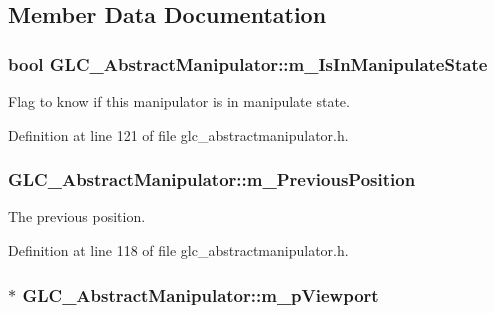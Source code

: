 \subsection{Member Data Documentation}
\hypertarget{class_g_l_c___abstract_manipulator_ace23989bdf7072dcecd4f005e5b95485}{
\subsubsection[{m\-\_\-\-Is\-In\-Manipulate\-State}]{\setlength{\rightskip}{0pt plus 5cm}bool G\-L\-C\-\_\-\-Abstract\-Manipulator\-::m\-\_\-\-Is\-In\-Manipulate\-State\hspace{0.3cm}{\ttfamily [protected]}}}\label{class_g_l_c___abstract_manipulator_ace23989bdf7072dcecd4f005e5b95485}


Flag to know if this manipulator is in manipulate state. 



Definition at line 121 of file glc\-\_\-abstractmanipulator.\-h.

\hypertarget{class_g_l_c___abstract_manipulator_a686032db93afdc2bee8248bded9c74dc}{
\subsubsection[{m\-\_\-\-Previous\-Position}]{ G\-L\-C\-\_\-\-Abstract\-Manipulator\-::m\-\_\-\-Previous\-Position\hspace{0.3cm}{\ttfamily [protected]}}}\label{class_g_l_c___abstract_manipulator_a686032db93afdc2bee8248bded9c74dc}


The previous position. 



Definition at line 118 of file glc\-\_\-abstractmanipulator.\-h.

\hypertarget{class_g_l_c___abstract_manipulator_aedaf22a999525d7d14b8f366d97d19e2}{
\subsubsection[{m\-\_\-p\-Viewport}]{$\ast$ G\-L\-C\-\_\-\-Abstract\-Manipulator\-::m\-\_\-p\-Viewport\hspace{0.3cm}{\ttfamily [protected]}}}\label{class_g_l_c___abstract_manipulator_aedaf22a999525d7d14b8f366d97d19e2}


